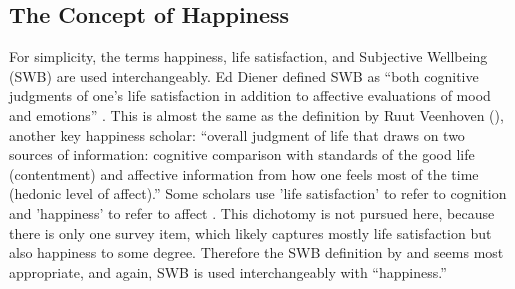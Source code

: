 \documentclass[12pt, letterpaper]{article}
\begin{document}
\begin{spacing}{1.9}
\section*{The Concept of Happiness}

For simplicity,  the terms happiness, life satisfaction, and
Subjective Wellbeing (SWB) are used interchangeably. 
Ed Diener  defined
SWB as %
``both cognitive judgments of one's life
 satisfaction in addition to affective evaluations of mood and emotions''
\citep[][p. 213]{diener1999_C}. This is almost 
 the same as the definition by Ruut Veenhoven (\citeyear[p. 2]{veenhoven08}), another key happiness
 scholar: ``overall judgment of life that draws on two sources of information: cognitive comparison with standards of the good life (contentment) and affective information from how one feels most of the time (hedonic level of affect).'' 
 Some scholars use 'life satisfaction' to  refer to cognition and 'happiness' to
 refer to affect \citep[e.g.,][]{dorahy98etal}. This dichotomy is not pursued here, because
   there is only one survey item, which likely captures
   mostly life satisfaction but also happiness to some
   degree. Therefore the SWB definition by 
 \citet{diener1999_C} and \citet{veenhoven08} seems most appropriate, and
 again, SWB is used interchangeably   with ``happiness.''


\end{spacing}
\end{document}
